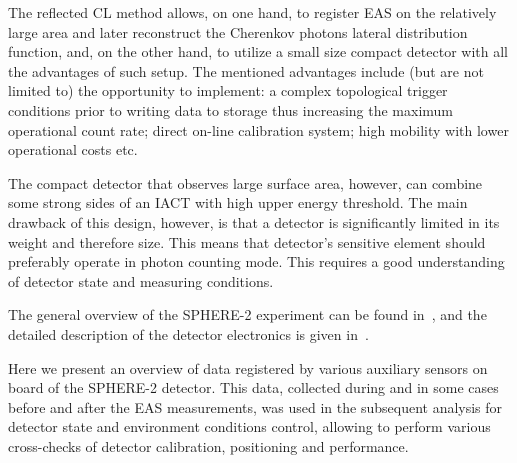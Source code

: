 \documentclass[final,5p,times,twocolumn]{elsarticle}
\begin{document}
The reflected CL method allows, on one hand, to register EAS on the relatively large area and later reconstruct the Cherenkov photons lateral distribution function, and, on the other hand, to utilize a small size compact detector with all the advantages of such setup. The mentioned advantages include (but are not limited to) the opportunity to implement: a complex topological trigger conditions prior to writing data to storage thus increasing the maximum operational count rate; direct on-line calibration system; high mobility with lower operational costs etc.

The compact detector that observes large surface area, however, can combine some strong sides of an IACT with high upper energy threshold. The main drawback of this design, however, is that a detector is significantly limited in its weight and therefore size. This means that detector's sensitive element should preferably operate in photon counting mode. This requires a good understanding of detector state and measuring conditions.

The general overview of the SPHERE-2 experiment can be found in~\cite{Ant15a}, and the detailed description of the detector electronics is given in~\cite{Ant20}. 

Here we present an overview of data registered by various auxiliary sensors on board of the SPHERE-2 detector. This data, collected during and in some cases before and after the EAS measurements, was used in the subsequent analysis for detector state and environment conditions control, allowing to perform various cross-checks of detector calibration, positioning and performance.
\end{document}
